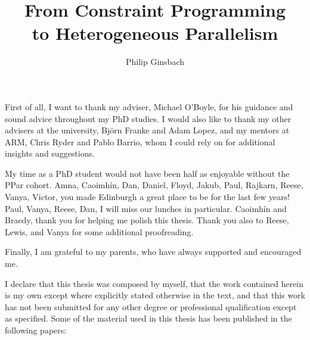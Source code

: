 \documentclass[phd,icsa,twoside,logo,11pt]{infthesis}
\title{From Constraint Programming\\to Heterogeneous Parallelism}
\author{Philip Ginsbach}
\newenvironment{laysummary}
   {\renewcommand{\abstractname}{Lay Summary}\begin{mainabs}}
   {\end{mainabs}\renewcommand{\abstractname}{}{}}
\begin{document}
\abstract{}
\begin{preliminary}
\maketitle
\begin{abstract}

\end{abstract}
\begin{laysummary}

\end{laysummary}
\begin{acknowledgements}
    First of all, I want to thank my adviser, Michael O'Boyle, for his guidance
    and sound advice throughout my PhD studies.
    I would also like to thank my other advisers at the university,
    Björn Franke and Adam Lopez, and my mentors at ARM,
    Chris Ryder and Pablo Barrio, whom I could rely on for additional insights
    and suggestions.

    My time as a PhD student would not have been half as enjoyable without the
    PPar cohort.
    Amna, Caoimhín, Dan, Daniel, Floyd, Jakub, Paul, Rajkarn, Reese, Vanya,
    Victor, you made Edinburgh a great place to be for the last few years!
    Paul, Vanya, Reese, Dan, I will miss our lunches in particular.
    Caoimhín and Braedy, thank you for helping me polish this thesis.
    Thank you also to Reese, Lewis, and Vanya for some additional proofreading.

    Finally, I am grateful to my parents, who have always supported and
    encouraged me.

\end{acknowledgements}
\begin{declaration}
    I declare that this thesis was composed by myself, that the work contained
    herein is my own except where explicitly stated otherwise in the text, and
    that this work has not been submitted for any other degree or professional
    qualification except as specified.
    Some of the material used in this thesis has been published in the following
    papers:


\end{declaration}
\end{preliminary}
\end{document}
